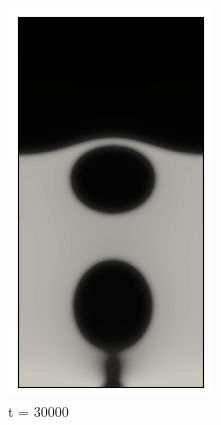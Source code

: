 \begin{figure}[h!]
\begin{subfigure}{0.25\textwidth}
		\includegraphics[width=\linewidth]{figs/cap4/bubble_30}
		\caption{t = 30000}
		\label{fig:5}
	\end{subfigure}\hfil 
	\begin{subfigure}{0.25\textwidth}

\end{subfigure}
\end{figure}
